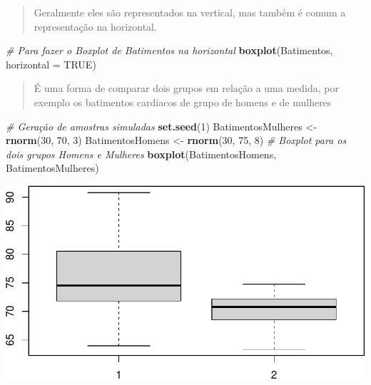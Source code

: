 \documentclass[
]{book}
\newenvironment{Shaded}{\begin{snugshade}}{\end{snugshade}}
\newcommand{\AttributeTok}[1]{\textcolor[rgb]{0.13,0.29,0.53}{#1}}
\newcommand{\CommentTok}[1]{\textcolor[rgb]{0.56,0.35,0.01}{\textit{#1}}}
\newcommand{\ConstantTok}[1]{\textcolor[rgb]{0.56,0.35,0.01}{#1}}
\newcommand{\DecValTok}[1]{\textcolor[rgb]{0.00,0.00,0.81}{#1}}
\newcommand{\FunctionTok}[1]{\textcolor[rgb]{0.13,0.29,0.53}{\textbf{#1}}}
\newcommand{\NormalTok}[1]{#1}
\newcommand{\OtherTok}[1]{\textcolor[rgb]{0.56,0.35,0.01}{#1}}
\begin{document}
\begin{quote}
Geralmente eles são representados na vertical, mas também é comum a representação na horizontal.
\end{quote}

\begin{Shaded}
\begin{Highlighting}[]
\CommentTok{\# Para fazer o Boxplot de Batimentos na horizontal}
\FunctionTok{boxplot}\NormalTok{(Batimentos, }\AttributeTok{horizontal =} \ConstantTok{TRUE}\NormalTok{)}
\end{Highlighting}
\end{Shaded}

\begin{quote}
É uma forma de comparar dois grupos em relação a uma medida, por exemplo os batimentos cardiacos de grupo de homens e de mulheres
\end{quote}

\begin{Shaded}
\begin{Highlighting}[]
\CommentTok{\# Geração de amostras simuladas}
\FunctionTok{set.seed}\NormalTok{(}\DecValTok{1}\NormalTok{)}
\NormalTok{BatimentosMulheres }\OtherTok{\textless{}{-}} \FunctionTok{rnorm}\NormalTok{(}\DecValTok{30}\NormalTok{, }\DecValTok{70}\NormalTok{, }\DecValTok{3}\NormalTok{)}
\NormalTok{BatimentosHomens }\OtherTok{\textless{}{-}} \FunctionTok{rnorm}\NormalTok{(}\DecValTok{30}\NormalTok{, }\DecValTok{75}\NormalTok{, }\DecValTok{8}\NormalTok{)}
\CommentTok{\# Boxplot para os dois grupos Homens e Mulheres }
\FunctionTok{boxplot}\NormalTok{(BatimentosHomens, BatimentosMulheres)}
\end{Highlighting}
\end{Shaded}

\includegraphics{Livro-Estatistica+R_files/figure-latex/unnamed-chunk-20-1.pdf}
\end{document}
